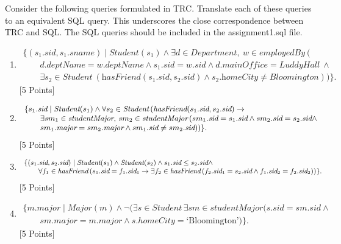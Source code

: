 \documentclass{article}
\begin{document}
Consider the following queries formulated in TRC. Translate each of these queries to an
equivalent SQL query.
This underscores the close correspondence between TRC and SQL.
The SQL queries should be included in the assignment1.sql file.

\begin{enumerate}[resume]

\item  
{\small
\[
\begin{array}{ll}
\{(s_1.\textit{sid}, s_1.\textit{sname}) \mid \textit{Student}(s_1) \land \exists d \in \textit{Department}, \ w \in \textit{employedBy} \ ( \\
\qquad d.\textit{deptName} = w.\textit{deptName} \land s_1.\textit{sid} = w.\textit{sid} \land d.\textit{mainOffice} = \textit{LuddyHall} \ \land \\
\qquad \exists s_2 \in \textit{Student} \ (\textit{hasFriend}(s_1.\textit{sid}, s_2.\textit{sid}) \land s_2.\textit{homeCity} \neq \textit{Bloomington}) ) \}.
\end{array}
\]
}   [5 Points]

\item 
{\tiny
\[
\small
\begin{array}{ll}
\{s_1.\textit{sid} \mid \textit{Student}(s_1) \land \forall s_2 \in \textit{Student} \, ( \textit{hasFriend}(s_1.\textit{sid}, s_2.\textit{sid}) \rightarrow \\
\qquad \exists sm_1 \in \textit{studentMajor}, \, sm_2 \in \textit{studentMajor} \, (sm_1.\textit{sid} = s_1.\textit{sid} \land sm_2.\textit{sid} = s_2.\textit{sid} \land \\
\qquad sm_1.\textit{major} = sm_2.\textit{major} \land sm_1.\textit{sid} \neq sm_2.\textit{sid}))\}.
\end{array}
\]
} [5 Points]


\item  
\[
\small
\begin{array}{ll}
\{(s_1.\textit{sid}, s_2.\textit{sid}) \mid \textit{Student}(s_1) \land \textit{Student}(s_2) \land s_1.\textit{sid} \leq s_2.\textit{sid} \land \\
\qquad \forall f_1 \in \textit{hasFriend} \, (s_1.\textit{sid} = f_1.\textit{sid}_1 \rightarrow \exists f_2 \in \textit{hasFriend} \, (f_2.\textit{sid}_1 = s_2.\textit{sid} \land f_1.\textit{sid}_2 = f_2.\textit{sid}_2))\}.
\end{array}
\]  [5 Points]


\item  
{\small
\[
\begin{array}{ll}
\{m.major\mid Major(m) \land \lnot (\exists s\in Student\, \exists sm\in studentMajor (s.sid = sm.sid\land \\
\qquad sm.major = m.major \land s.homeCity = \mbox{`Bloomington'})\}.
\end{array}
\]
}  [5 Points]



\end{enumerate}
\end{document}
